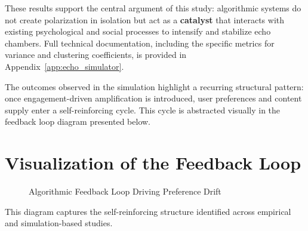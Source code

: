 \documentclass[12pt,a4paper]{report}
\begin{document}
These results support the central argument of this study: algorithmic systems do not create polarization in isolation but act as a \textbf{catalyst} that interacts with existing psychological and social processes to intensify and stabilize echo chambers. Full technical documentation, including the specific metrics for variance and clustering coefficients, is provided in Appendix~\ref{app:echo_simulator}.

The outcomes observed in the simulation highlight a recurring structural pattern: once engagement-driven amplification is introduced, user preferences and content supply enter a self-reinforcing cycle. This cycle is abstracted visually in the feedback loop diagram presented below.



\section{Visualization of the Feedback Loop}

\begin{figure}[H]
  \centering
  \caption{Algorithmic Feedback Loop Driving Preference Drift}
\end{figure}

This diagram captures the self-reinforcing structure identified across empirical and simulation-based studies.
\end{document}
